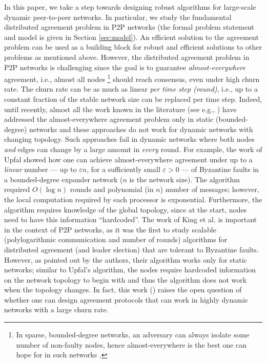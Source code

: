 \documentclass[leqno,11pt]{article}
\renewcommand{\epsilon}{\varepsilon}
\begin{document}
In this paper, we take a step towards  designing robust  algorithms for large-scale dynamic
peer-to-peer networks. In particular, we  study the fundamental  distributed agreement problem in  P2P networks (the formal problem statement and model is given in Section \ref{sec:model}). An efficient solution to the agreement problem can be used as a building block for robust and efficient solutions to other problems as mentioned above. 
However, the distributed agreement problem in P2P networks is challenging since the goal
is to guarantee {\em almost-everywhere} agreement, i.e., almost all nodes
\footnote{In sparse, bounded-degree networks,
an adversary can always isolate some number of non-faulty nodes, hence almost-everywhere is
the best one can hope for in such networks \cite{DPPU88}.} 
should reach consensus,  even under high churn rate. The churn rate
can be as much as linear  {\em per time step (round)},  i.e., up to a constant fraction of the stable network size can be replaced per time step.  
Indeed, until recently, almost all the work 
 known in the literature (see e.g., \cite{DPPU88,KKKSS10, KS10,KSS06, Upfal94})  have addressed the almost-everywhere agreement problem only in
 static (bounded-degree) networks and these approaches do not work for dynamic networks with changing topology. 
Such approaches fail in dynamic networks where both nodes {\em and} edges can change by a large amount
in {\em every} round.
   For example, the work of Upfal \cite{Upfal94} showed how
 one can achieve almost-everywhere agreement under up to a {\em linear} number --- up to $\epsilon n$, for a sufficiently small $\epsilon > 0$ ---  of Byzantine faults in a bounded-degree expander network ($n$ is the network size).  The algorithm required $O(\log n)$ rounds and polynomial (in $n$) number of messages; however,  the local computation required by
each processor is exponential.  Furthermore, the algorithm  requires  knowledge
of the global topology, since at the start, nodes need to have this information
``hardcoded''.
 The work of King et al. \cite{KSSV06} is important in the context of P2P networks, as it was the first to study scalable (polylogarithmic communication and number of rounds) algorithms for distributed agreement (and leader election)
that are tolerant to Byzantine faults. However, as pointed out by the authors, their algorithm works only for static networks; similar to Upfal's algorithm, the nodes require 
hardcoded information on the network topology to begin with  and thus the
algorithm does not work when the topology changes.  In fact, this work (\cite{KSSV06})
raises the open question of whether one can design agreement  protocols that
can work in highly dynamic networks with a large churn rate.
\end{document}
